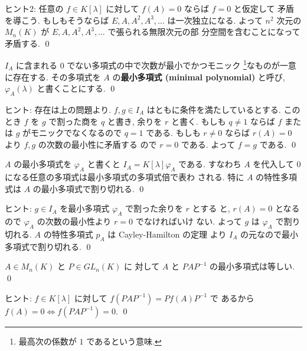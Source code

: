\documentclass[12pt,twoside]{jarticle}
\begin{document}
\noindent
ヒント2: 任意の $f\in K[\lambda]$ に対して $f(A)=0$ ならば $f=0$ と仮定して
矛盾を導こう.  もしもそうならば $E,A,A^2,A^3,\ldots$ は一次独立になる.
よって $n^2$ 次元の $M_n(K)$ が $E,A,A^2,A^3,\ldots$ で張られる無限次元の部
分空間を含むことになって矛盾する.
\qed


\begin{question}[最小多項式の定義]
\label{q:minimal-polyn-2}
  $I_A$ に含まれる $0$ でない多項式の中で次数が最小でかつモニック%
  \footnote{最高次の係数が $1$ であるという意味.}なものが一意に存在する.
  その多項式を $A$ の{\bf 最小多項式 (minimal polynomial)} と呼び,
  $\varphi_A(\lambda)$ と書くことにする.
  \qed
\end{question}

\noindent
ヒント: 存在は上の問題より.  $f,g\in I_A$ はともに条件を満たしているとする.
このとき $f$ を $g$ で割った商を $q$ と書き, 余りを $r$ と書く.
もしも $q\ne 1$ ならば $f$ または $g$ がモニックでなくなるので $q=1$ である.
もしも $r\ne 0$ ならば $r(A)=0$ より $f,g$ の次数の最小性に矛盾する
ので $r=0$ である.  よって $f=g$ である.
\qed


\begin{question}
\label{q:minimal-polyn-3}
  $A$ の最小多項式を $\varphi_A$ と書くと $I_A = K[\lambda]\varphi_A$ である.
  すなわち $A$ を代入して $0$ になる任意の多項式は最小多項式の多項式倍で表わ
  される.  特に $A$ の特性多項式は $A$ の最小多項式で割り切れる.
  \qed
\end{question}

\noindent
ヒント: $g\in I_A$ を最小多項式 $\varphi_A$ で割った余りを $r$ とする
と, $r(A)=0$ となるので $\varphi_A$ の次数の最小性より $r=0$ でなければいけ
ない.  よって $g$ は $\varphi_A$ で割り切れる. 
$A$ の特性多項式 $p_A$ は Cayley-Hamilton の定理
より $I_A$ の元なので最小多項式で割り切れる.
\qed


\begin{question}
\label{q:minimal-polyn-4}
  $A\in M_n(K)$ と $P\in GL_n(K)$ に
  対して $A$ と $PAP^{-1}$ の最小多項式は等しい. \qed
\end{question}

\noindent
ヒント: $f\in K[\lambda]$ に対して $f(PAP^{-1})=Pf(A)P^{-1}$ で
あるから $f(A)=0 \iff f(PAP^{-1})=0$.
\qed
\end{document}
